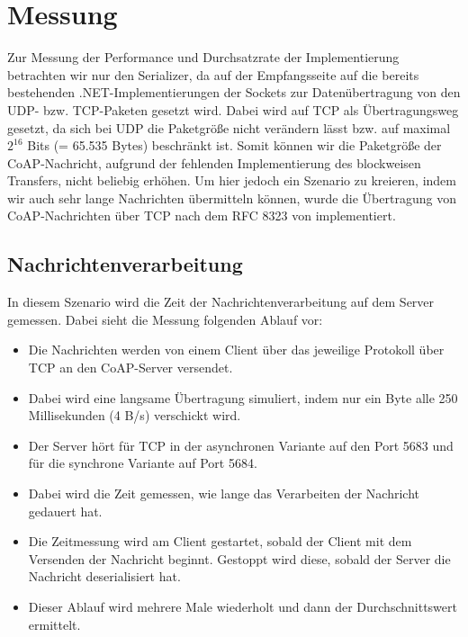 \section{Messung}
\label{sec:messung}

Zur Messung der Performance und Durchsatzrate der Implementierung betrachten wir nur den Serializer, da auf der Empfangsseite auf die bereits bestehenden .NET-Implementierungen der Sockets zur Datenübertragung von den UDP- bzw. TCP-Paketen gesetzt wird. Dabei wird auf TCP als Übertragungsweg gesetzt, da sich bei UDP die Paketgröße nicht verändern lässt bzw. auf maximal $2^{16}$ Bits (= 65.535 Bytes) beschränkt ist. Somit können wir die Paketgröße der CoAP-Nachricht, aufgrund der fehlenden Implementierung des blockweisen Transfers, nicht beliebig erhöhen. Um hier jedoch ein Szenario zu kreieren, indem wir auch sehr lange Nachrichten übermitteln können, wurde die Übertragung von CoAP-Nachrichten über TCP nach dem RFC 8323 von \citeauthor{RFC8323} \cite{RFC8323} implementiert.

\subsection{Nachrichtenverarbeitung}
\label{subsec:nachrichtenverarbeitung}

In diesem Szenario wird die Zeit der Nachrichtenverarbeitung auf dem Server gemessen. Dabei sieht die Messung folgenden Ablauf vor:
\begin{itemize}
    \item Die Nachrichten werden von einem Client über das jeweilige Protokoll über TCP an den CoAP-Server versendet.
    \item Dabei wird eine langsame Übertragung simuliert, indem nur ein Byte alle 250 Millisekunden (4 B/s) verschickt wird.
    \item Der Server hört für TCP in der asynchronen Variante auf den Port 5683 und für die synchrone Variante auf Port 5684.
    \item Dabei wird die Zeit gemessen, wie lange das Verarbeiten der Nachricht gedauert hat.
    \item Die Zeitmessung wird am Client gestartet, sobald der Client mit dem Versenden der Nachricht beginnt. Gestoppt wird diese, sobald der Server die Nachricht deserialisiert hat.
    \item Dieser Ablauf wird mehrere Male wiederholt und dann der Durchschnittswert ermittelt.
\end{itemize}

